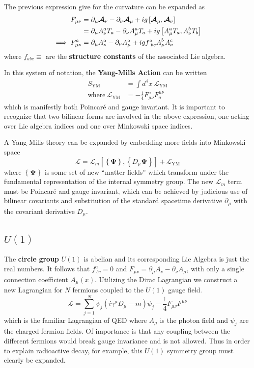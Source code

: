 The previous expression give for the curvature can be expanded as
\begin{align}
    F_{\mu\nu} &= \partial_\mu  \boldsymbol{\mathcal{A}} _\nu - \partial_\nu  \boldsymbol{\mathcal{A}} _\mu + ig \left[ { \boldsymbol{\mathcal{A}} _\mu},{ \boldsymbol{\mathcal{A}} _\nu} \right] \\
    &= \partial_\mu A_\nu^aT_a - \partial_\nu A_\mu^aT_a + ig \left[ {A_\mu^aT_a},{A_\nu^bT_b} \right] \\
    \implies F_{\mu\nu}^a &= \partial_\mu A_\nu^a - \partial_\nu A_\mu^a + igf^a_{\ bc}A_\mu^bA_\nu^c
\end{align}
where $f_{abc} \equiv $ are the \textbf{structure constants} of the associated Lie algebra.

In this system of notation, the \textbf{Yang-Mills Action} can be written
\newcommand{\YML}{ \ensuremath{ \mathcal{L}_{\mathrm{YM}} } }
\begin{align}
    S_{\mathrm{YM}} &= \int d^4x\ \YML\\
    \mathrm{where}\ \YML &= -\frac{1}{4} F_{\mu\nu}^a F^{\mu\nu}_a
\end{align}
which is manifestly both Poincar\'{e} and gauge invariant. It is important to recognize that two bilinear forms are involved in the above expression, one acting over Lie algebra indices and one over Minkowski space indices.

A Yang-Mills theory can be expanded by embedding more fields into Minkowski space
\newcommand{\YM}{ \ensuremath{ \mathcal{L}_m\left[ \left\{ \boldsymbol\Psi \right\}, \left\{ D_\mu \boldsymbol\Psi \right\} \right] }}
\begin{equation}
    \mathcal{L} = \YM + \YML
\end{equation}
where $\left\{ \boldsymbol\Psi \right\}$ is some set of new ``matter fields'' which transform under the fundamental representation of the internal symmetry group.
The new $\mathcal{L}_m$ term must be Poincar\'{e} and gauge invariant, which can be achieved by judicious use of bilinear covariants and substitution of the standard spacetime derivative $\partial_\mu$ with the covariant derivative $D_\mu$.
 
\subsection{$U(1)$}
The \textbf{circle group} $U(1)$ is abelian and its corresponding Lie Algebra is just the real numbers. It follows that $f^a_{\ bc} = 0$ and 
$F_{\mu\nu} = \partial_\mu A_\nu - \partial_\nu A_\mu$, with only a single connection coefficient $A_\mu(x)$.
Utilizing the Dirac Lagrangian we construct a new Lagrangian for $N$ fermions coupled to the $U(1)$ gauge field.
\begin{equation}
    \mathcal{L} = \sum_{j=1}^{N} \bar{\psi}_j \left( i\gamma^\mu D_\mu - m \right) \psi_j - \frac{1}{4}F_{\mu\nu}F^{\mu\nu}
\end{equation}
which is the familiar Lagrangian of QED where $A_\mu$ is the photon field and $\psi_j$ are the charged fermion fields.
Of importance is that any coupling between the different fermions would break gauge invariance and is not allowed.
Thus in order to explain radioactive decay, for example, this $U(1)$ symmetry group must clearly be expanded.

